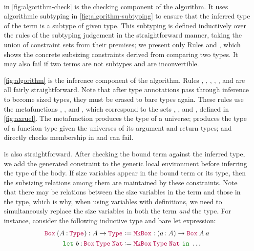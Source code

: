 



\paragraph*{}  in \autoref{fig:algorithm-check} is the checking component of the algorithm.
It uses algorithmic subtyping in \autoref{fig:algorithm-subtyping} to ensure that the inferred type of the term is a subtype of given type.
This subtyping is defined inductively over the rules of the subtyping judgement in the straightforward manner, taking the union of constraint sets from their premises;
we present only Rules  and ,
which shows the concrete subsizing constraints derived from comparing two \coinductive types.
It may also fail if two terms are not subtypes and are inconvertible.

\autoref{fig:algorithm} is the inference component of the algorithm. Rules , , , , , and  are all fairly straightforward.
Note that after type annotations pass through inference to become sized types, they must be erased to bare types again.
These rules use the metafunctions \axiom, , and \elim, which correspond to the sets \Axioms, \Rules, and \Elims, defined in \autoref{fig:axruel}.
The metafunction \axiom produces the type of a universe;  produces the type of a function type given the universes of its argument and return types; and \elim directly checks membership in \Elims and can fail.

 is also straightforward.
After checking the bound term against the inferred type, we add the generated constraint to the generic local environment before inferring the type of the body.
If size variables appear in the bound term or its type, then the subsizing relations among them are maintained by these constraints.
Note that there may be relations between the size variables in the term and those in the type, which is why, when using variables with definitions, we need to simultaneously replace the size variables in both the term \textit{and} the type.
For instance, consider the following inductive type and bare let expression:
\begin{align*}
  \app{\Box}{(\assm{A}{\Type{}})} : A \to \Type{} &\coloneqq
  \MkBox : (\assm{a}{A}) \to \app{\Box}{A}{a} \\
  \letin{b}{\app{\Box}{\Type{}}{\Nat}&}{\app{\MkBox}{\Type{}}{\Nat}}{\dots}
\end{align*}


